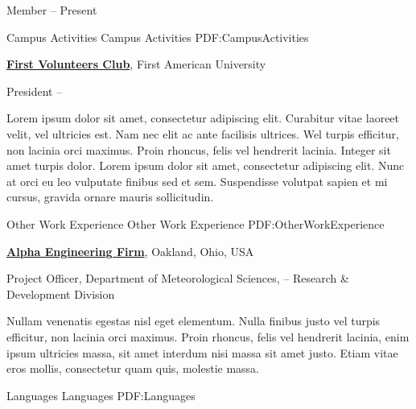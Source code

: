 \documentclass[letterpaper,MMMyyyy,nonstopmode]{simpleresumecv}
\begin{document}
\begin{Body}
\Gap
\BulletItem
Member
\hfill
{} --
Present

\newpage


\Section
{Campus Activities}
{Campus Activities}
{PDF:CampusActivities}

\Entry
\href{http://www.example.com/my-club}
{\textbf{First Volunteers Club}},
First American University

\Gap
\BulletItem
President
\hfill
{} --
\begin{Detail}
\SubBulletItem
Lorem ipsum dolor sit amet, consectetur adipiscing elit.
\SubBulletItem
Curabitur vitae laoreet velit, vel ultricies est. Nam nec elit ac ante facilisis ultrices.
\SubSubBulletItem
Wel turpis efficitur, non lacinia orci maximus.
\SubSubBulletItem
Proin rhoncus, felis vel hendrerit lacinia.
\SubBulletItem
Integer sit amet turpis dolor. Lorem ipsum dolor sit amet, consectetur adipiscing elit. Nunc at orci eu leo vulputate finibus sed et sem.
\SubBulletItem
Suspendisse volutpat sapien et mi cursus, gravida ornare mauris sollicitudin.
\end{Detail}


\Section
{Other Work\newline
Experience}
{Other Work Experience}
{PDF:OtherWorkExperience}

\Entry
\href{http://www.example.com/my-company}
{\textbf{Alpha Engineering Firm}},
Oakland, Ohio, USA

\Gap
\BulletItem
Project Officer,
Department of Meteorological Sciences,
\hfill
{} --
\newline
Research \& Development Division
\begin{Detail}
\SubBulletItem
Nullam venenatis egestas nisl eget elementum.
\SubBulletItem
Nulla finibus justo vel turpis efficitur, non lacinia orci maximus. Proin rhoncus, felis vel hendrerit lacinia, enim ipsum ultricies massa, sit amet interdum nisi massa sit amet justo.
\SubBulletItem
Etiam vitae eros mollis, consectetur quam quis, molestie massa.
\end{Detail}


\Section
{Languages}
{Languages}
{PDF:Languages}


\end{Body}
\end{document}

